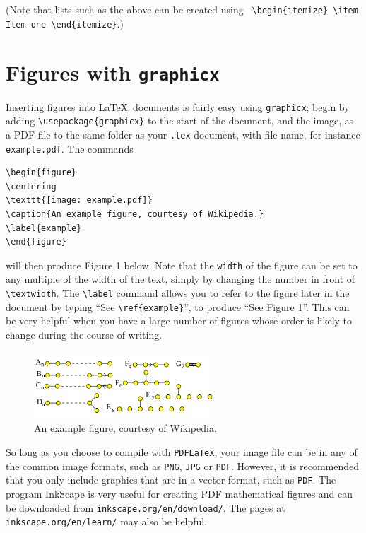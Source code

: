 \documentclass[11pt]{article}
\begin{document}
(Note that lists such as the above can be created using \verb$ \begin{itemize} \item Item one \end{itemize}$.)

\section{Figures with \texttt{graphicx}}

Inserting figures into \LaTeX\ documents is fairly easy using \texttt{graphicx}; begin by adding \verb$\usepackage{graphicx}$ to the start of the document, and the image, as a PDF file to the same folder as your \verb$.tex$ document, with file name, for instance \verb$example.pdf$. The commands
\begin{verbatim}
\begin{figure}
\centering
\texttt{[image: example.pdf]}
\caption{An example figure, courtesy of Wikipedia.}
\label{example}
\end{figure}
\end{verbatim}
will then produce Figure 1 below. Note that the \verb$width$ of the figure can be set to any multiple of the width of the text, simply by changing the number in front of \verb$\textwidth$. The \verb$\label$ command allows you to refer to the figure later in the document by typing ``See \verb$\ref{example}$'', to produce ``See Figure \ref{example}''. This can be very helpful when you have a large number of figures whose order is likely to change during the course of writing.
\paragraph{}

\begin{figure}[h]
\centering
\includegraphics[width=0.6\textwidth]{example.png}
\caption{An example figure, courtesy of Wikipedia.}
\label{example}
\end{figure}

So long as you choose to compile with \texttt{PDFLaTeX}, your image file can be in any of the common image formats, such as \texttt{PNG}, \texttt{JPG} or \texttt{PDF}. However, it is recommended that you only include graphics that are in a vector format, such as \texttt{PDF}. The program InkScape is very useful for creating PDF mathematical figures and can be downloaded from \verb$inkscape.org/en/download/$. The pages at \verb$inkscape.org/en/learn/$ may also be helpful.
\end{document}
